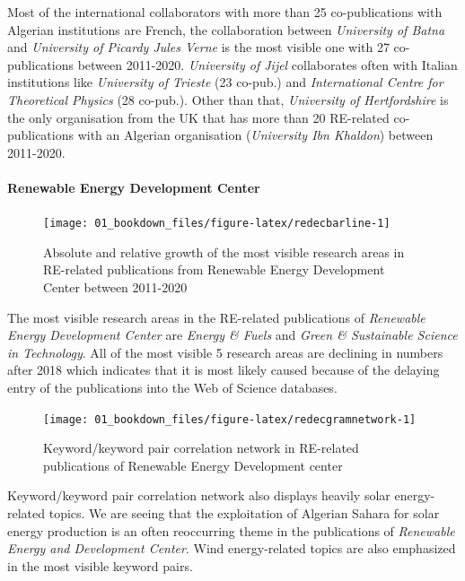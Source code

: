 \documentclass[
]{book}
\begin{document}
Most of the international collaborators with more than 25 co-publications with Algerian institutions are French, the collaboration between \emph{University of Batna} and \emph{University of Picardy Jules Verne} is the most visible one with 27 co-publications between 2011-2020. \emph{University of Jijel} collaborates often with Italian institutions like \emph{University of Trieste} (23 co-pub.) and \emph{International Centre for Theoretical Physics} (28 co-pub.). Other than that, \emph{University of Hertfordshire} is the only organisation from the UK that has more than 20 RE-related co-publications with an Algerian organisation (\emph{University Ibn Khaldon}) between 2011-2020.

\hypertarget{renewable-energy-development-center}{%
\paragraph{Renewable Energy Development Center}\label{renewable-energy-development-center}}

\begin{figure}
\texttt{[image: 01\_bookdown\_files/figure-latex/redecbarline-1]} \caption{Absolute and relative growth of the most visible research areas in RE-related publications from Renewable Energy Development Center between 2011-2020}\label{fig:redecbarline}
\end{figure}

The most visible research areas in the RE-related publications of \emph{Renewable Energy Development Center} are \emph{Energy \& Fuels} and \emph{Green \& Sustainable Science in Technology}. All of the most visible 5 research areas are declining in numbers after 2018 which indicates that it is most likely caused because of the delaying entry of the publications into the Web of Science databases.

\begin{figure}
\texttt{[image: 01\_bookdown\_files/figure-latex/redecgramnetwork-1]} \caption{Keyword/keyword pair correlation network in RE-related publications of Renewable Energy Development center}\label{fig:redecgramnetwork}
\end{figure}

Keyword/keyword pair correlation network also displays heavily solar energy-related topics. We are seeing that the exploitation of Algerian Sahara for solar energy production is an often reoccurring theme in the publications of \emph{Renewable Energy and Development Center}. Wind energy-related topics are also emphasized in the most visible keyword pairs.
\end{document}
